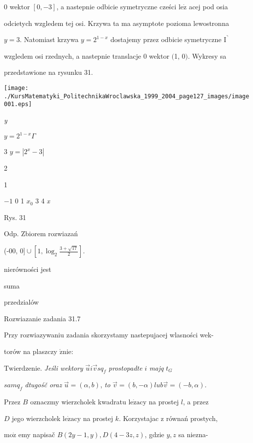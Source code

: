 \documentclass[a4paper,12pt]{article}
\begin{document}
$0$ wektor $[0,-3]$, a nastepnie odbicie symetryczne cześci $\mathrm{l}\mathrm{e}\dot{\mathrm{z}}$ acej pod osia

odcietych wzgledem tej osi. Krzywa ta ma asymptote pozioma lewostronna

$y=3$. Natomiast krzywa $y=2^{1-x}$ dostajemy przez odbicie symetryczne $\mathrm{I}^{\urcorner}$

wzgledem osi rzednych, a nastepnie translacje $0$ wektor $($1, $0)$. Wykresy sa

przedstawione na rysunku 31.
\begin{center}
\texttt{[image: ./KursMatematyki\_PolitechnikaWroclawska\_1999\_2004\_page127\_images/image001.eps]}
\end{center}
{\it y}

$y=2^{1-x}  \Gamma$

3  $y=|2^{x}-3|$

2

1

$-1$  0 1  $x_{0}$  3 4  {\it x}

Rys. 31

Odp. Zbiorem rozwiazań

(-00, $ 0]\cup [1,\displaystyle \log_{2}\frac{3+\sqrt{17}}{2}].$

nierówności jest

suma

przedzialów

Rozwiazanie zadania 31.7

Przy rozwiazywaniu zadania skorzystamy nastepujacej wlasności wek-

torów na plaszczy $\acute{\mathrm{z}}\mathrm{n}\mathrm{i}\mathrm{e}$:

$\mathrm{T}\mathrm{w}\mathrm{i}\mathrm{e}\mathrm{r}\mathrm{d}\mathrm{z}\mathrm{e}\mathrm{n}\mathrm{i}\mathrm{e}$. {\it Jeśli wektory} $\vec{u}i\vec{v}sq_{f}$ {\it prostopadte} $i$ {\it majq} $t_{G}$

$samq_{f}$ {\it dtugośč oraz} $\vec{u}=(\alpha,b)$, {\it to} $\vec{v}=(b,-\alpha) lub\vec{v}=(-b,\alpha).$

Przez $B$ oznaczmy wierzcholek kwadratu $\mathrm{l}\mathrm{e}\dot{\mathrm{z}}\mathrm{a}\mathrm{c}\mathrm{y}$ na prostej $l$, a przez

$D$ jego wierzcholek $\mathrm{l}\mathrm{e}\dot{\mathrm{z}}\mathrm{a}\mathrm{c}\mathrm{y}$ na prostej $k$. Korzystajac $\mathrm{z}$ równań prostych,

$\mathrm{m}\mathrm{o}\dot{\mathrm{z}}$ emy napisač $B(2y-1,y), D(4-3z,z)$, gdzie $y, z$ sa niezna-
\end{document}
